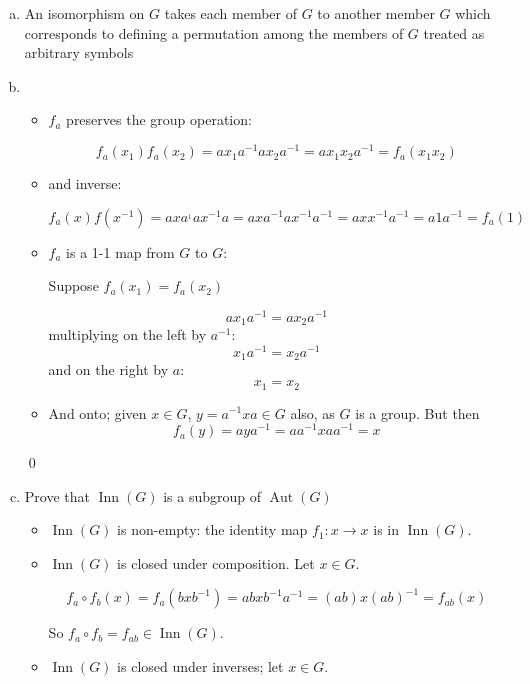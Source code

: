 \documentclass[11pt,oneside]{article}
\numberwithin{equation}{section}
\theoremstyle{definition}
\def\Aut{\operatorname{Aut}}
\def\Inn{\operatorname{Inn}}
\begin{document}
  \begin{solution}
    \begin{enumerate}[(a)]
      \item
      An isomorphism on $G$ takes each member of $G$ to another member $G$ which corresponds to defining a permutation among the members of $G$ treated as arbitrary symbols
    \item
      \begin{itemize}
        \item
          $f_a$ preserves the group operation:
          
        $$
        f_a(x_1) f_a(x_2) = a x_1 a^{-1} a x_2 a ^{-1} = a x_1 x_2 a^ {-1} = f_a ( x_1 x_2 )
        $$
      \item
        and inverse:

         $$
        f_a(x) f(x ^ {-1}) = a x a^ { _1} a x ^ {-1} a = a x a ^ {-1} a x ^ {-1} a ^ {-1} = a x x ^ {-1} a ^ {-1} = a 1 a ^{-1} = f_a(1)
        $$
        
        \item
          $f_a$ is a 1-1 map from $G$ to $G$:

          Suppose $f_a(x_1) = f_a(x_2)$

          $$
          a x_1 a^ {-1} = a x_2 a ^ {-1}
          $$
          multiplying on the left by $a^{-1}$:
          $$
          x_1 a^ {-1} = x_2 a ^ {-1}
          $$
          and on the right by $a$:
          $$
          x_1 = x_2
          $$
        \item
          And onto; given $x \in G$, $ y= a^ {-1} x a \in G$ also, as $G$ is a group.
          But then
          $$
          f_a(y) = a y a ^ {-1} = a a ^ {-1} x a a ^ {-1} = x
          $$
      \end{itemize}
      \qed
    \item
      Prove that $\Inn(G)$ is a subgroup of $\Aut(G)$
      \begin{itemize}
      \item
        $\Inn(G)$ is non-empty: the identity map $f_1 : x \to x$ is in $\Inn(G)$.
      \item
        $\Inn(G)$ is closed under composition.  Let $x \in G$.  

        $$
        f_a \circ f_b (x) = f_a(bxb^{-1}) = a b x b^{-1} a^{-1} = (ab) x (ab)^ {-1} = f_{ab} (x)
          $$

        So $f_a \circ f_b = f _ {ab} \in \Inn(G)$.

      \item
        $\Inn(G)$ is closed under inverses; let $x \in G$.


\end{itemize}
\end{enumerate}
\end{solution}
\end{document}
